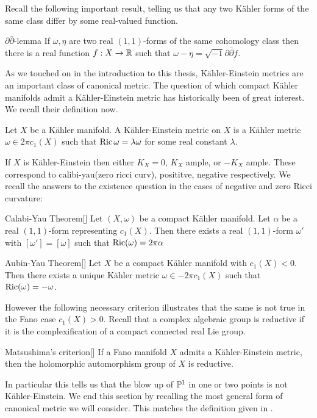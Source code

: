 Recall the following important result, telling us that any two K\"ahler forms of the same class differ by some real-valued function.
\begin{namedthm}{\(\partial \bar{\partial}\)-lemma}
If \(\omega, \eta\) are two real \((1,1)\)-forms of the same cohomology class then there is a real function \(f: X \to \mathbb{R}\) such that \(\omega - \eta = \sqrt{-1} \partial \bar{\partial} f\).
\end{namedthm}
As we touched on in the introduction to this thesis, K\"ahler-Einstein metrics are an important class of canonical metric. The question of which compact K\"ahler manifolds admit a K\"ahler-Einstein metric has historically been of great interest. We recall their definition now.
\begin{definition}
Let \(X\) be a K\"ahler manifold. A K\"ahler-Einstein metric on \(X\) is a K\"ahler metric \(\omega \in 2 \pi c_1(X)\) such that \(\mathop{\rm Ric}\nolimits \omega = \lambda \omega\) for some real constant \(\lambda\).
\end{definition}
If \(X\) is K\"ahler-Einstein then either \(K_X = 0\), \(K_X\) ample, or \(-K_X\) ample. These correspond to calibi-yau(zero ricci curv), posititve, negative respectively. We recall the answers to the existence question in the cases of negative and zero Ricci curvature:
\begin{namedthm}{Calabi-Yau Theorem}[\cite{}]
Let \((X,\omega)\) be a compact K\"ahler manifold. Let \(\alpha\) be a real \((1,1)\)-form representing \(c_1(X)\). Then there exists a real \((1,1)\)-form \(\omega'\) with \([\omega'] = [\omega]\) such that \(\mathop{\rm Ric}\nolimits(\omega) = 2 \pi \alpha \)
\end{namedthm}
\begin{namedthm}{Aubin-Yau Theorem}[\cite{}]
Let \(X\) be a compact K\"ahler manifold with \(c_1(X) < 0 \). Then there exists a unique K\"ahler metric \(\omega \in -2 \pi c_1(X)\) such that \(\mathop{\rm Ric}\nolimits(\omega) = -\omega\).
\end{namedthm}
However the following necessary criterion illustrates that the same is not true in the Fano case \(c_1(X)> 0\). Recall that a complex algebraic group is reductive if it is the complexification of a compact connected real Lie group.
\begin{namedthm}{Matsushima's criterion}[\cite{}]
If a Fano manifold \(X\) admits a K\"ahler-Einstein metric, then the holomorphic automorphism group of \(X\) is reductive.
\end{namedthm}
In particular this tells us that the blow up of \(\mathbb{P}^1\) in one or two points is not K\"ahler-Einstein. We end this section by recalling the most general form of canonical metric we will consider. This matches the definition given in \cite[Definiton X]{datar2016kahler}.
